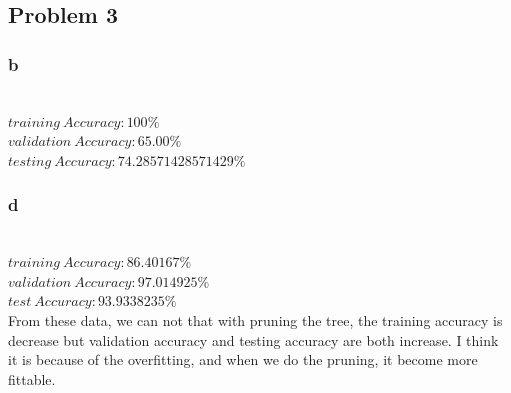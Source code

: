 \documentclass[12pt]{article}
\begin{document}
        \subsection{Problem 3}
            \subsubsection{b}
\\$training\ Accuracy: 100\%$
\\$validation\ Accuracy: 65.00\%$
\\$testing\ Accuracy: 74.28571428571429\%$
            \subsubsection{d}
\\$training\ Accuracy: 86.40167\%$
\\$validation\ Accuracy: 97.014925\%$
\\$test\ Accuracy: 93.9338235\%$
\\ From these data, we can not that with pruning the tree, the training accuracy is decrease 
but validation accuracy and testing accuracy are both increase. I think it is because of the 
overfitting, and when we do the pruning, it become more fittable.
\end{document}
